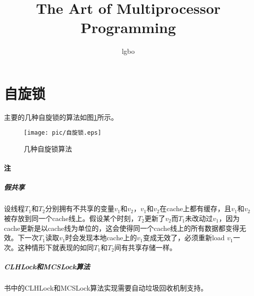 \documentclass{article}
\title{The Art of Multiprocessor Programming}
\author{lgbo}
\begin{document}
\maketitle

\tableofcontents
\section{自旋锁}
主要的几种自旋锁的算法如图\ref{spinlocks}所示。
\begin{figure}[h]
	\centering
	\texttt{[image: pic/自旋锁.eps]}
	\caption{几种自旋锁算法\label{spinlocks}}
\end{figure}

\paragraph*{注}
\subparagraph*{假共享}
设线程$T_1$和$T_2$分别拥有不共享的变量$v_1$和$v_2$，$v_1$和$v_2$在cache上都有缓存，且$v_1$和$v_2$被存放到同一个cache线上。假设某个时刻，$T_2$更新了$v_2$而$T_1$未改动过$v_1$，因为cache更新是以cache线为单位的，这会使得同一个cache线上的所有数据都变得无效。下一次$T_1$读取$v_1$时会发现本地cache上的$v_1$变成无效了，必须重新load $v_1$一次。这种情形下就表现的如同$T_1$和$T_2$间有共享存储一样。
%
\subparagraph*{CLHLock和MCSLock算法}书中的CLHLock和MCSLock算法实现需要自动垃圾回收机制支持。
% 
\end{document}
